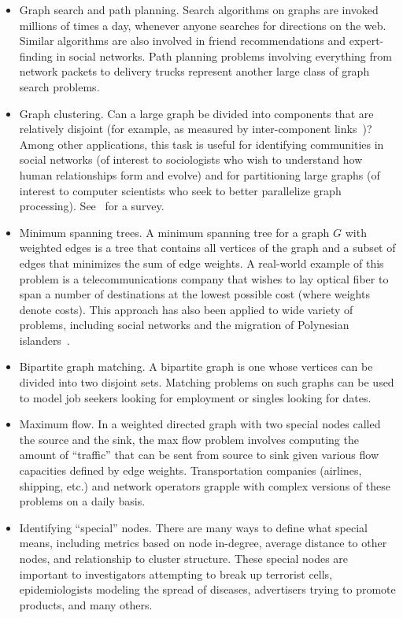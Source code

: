 \begin{itemize}

\item Graph search and path planning.  Search algorithms on graphs are
  invoked millions of times a day, whenever anyone searches for
  directions on the web.  Similar algorithms are also involved in
  friend recommendations and expert-finding in social networks.  Path
  planning problems involving everything from network packets to
  delivery trucks represent another large class of graph search
  problems.

\item Graph clustering.  Can a large graph be divided into components
  that are relatively disjoint (for example, as measured by
  inter-component links~\cite{Girvan02})?  Among other applications,
  this task is useful for identifying communities in social networks
  (of interest to sociologists who wish to understand how human
  relationships form and evolve) and for partitioning large graphs (of
  interest to computer scientists who seek to better parallelize graph
  processing).  See~\cite{XuR_Wunsch_2005b} for a survey.

\item Minimum spanning trees.  A minimum spanning tree for a graph $G$
  with weighted edges is a tree that contains all vertices of the
  graph and a subset of edges that minimizes the sum of edge weights.
  A real-world example of this problem is a telecommunications company
  that wishes to lay optical fiber to span a number of destinations at
  the lowest possible cost (where weights denote costs).  This
  approach has also been applied to wide variety of problems,
  including social networks and the migration of Polynesian
  islanders~\cite{Hage_1996}.

\item Bipartite graph matching.  A bipartite graph is one whose
  vertices can be divided into two disjoint sets.  Matching problems
  on such graphs can be used to model job seekers looking for
  employment or singles looking for dates.

\item Maximum flow. In a weighted directed graph with two special
  nodes called the source and the sink, the max flow problem involves
  computing the amount of ``traffic'' that can be sent from source to
  sink given various flow capacities defined by edge weights.
  Transportation companies (airlines, shipping, etc.) and network
  operators grapple with complex versions of these problems on a daily
  basis.

\item Identifying ``special'' nodes.  There are many ways to define
  what special means, including metrics based on node in-degree,
  average distance to other nodes, and relationship to cluster
  structure.  These special nodes are important to investigators
  attempting to break up terrorist cells, epidemiologists modeling the
  spread of diseases, advertisers trying to promote products, and many
  others.

\end{itemize}

